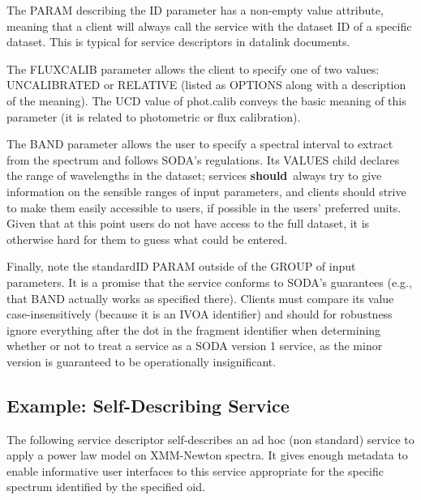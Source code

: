 \documentclass[11pt,a4paper]{ivoa}
\newcommand{\rfcshould}{\textbf{should}}
\begin{document}
The PARAM describing the ID parameter has a non-empty value attribute,
meaning that a client will always call the service with the dataset ID
of a specific dataset.  This is typical for service descriptors in
datalink documents.

The FLUXCALIB parameter allows the client to specify one of two values:
UNCALIBRATED or RELATIVE (listed as OPTIONS along with a description of
the meaning). The UCD \citep{2005ivoa.spec.0819D} value
of phot.calib conveys the basic meaning
of this parameter (it is related to photometric or flux calibration).


The BAND parameter allows the user to specify a spectral interval to
extract from the spectrum and follows SODA's regulations.  Its VALUES
child declares the range of wavelengths in the dataset; services \rfcshould\
always try to give information on the sensible ranges of input
parameters, and clients should strive to make them easily accessible to
users, if possible in the users' preferred units.  Given that at this
point users do not have access to the full dataset, it is otherwise hard
for them to guess what could be entered.

Finally, note the standardID PARAM outside of the GROUP of input
parameters.  It is a promise that the service conforms to SODA's
guarantees (e.g., that BAND actually works as specified there).  Clients
must compare its value case-insensitively (because it is an IVOA
identifier) and should for robustness ignore everything after the dot in
the fragment identifier when determining whether or not to treat a
service as a SODA version 1 service, as the minor version is guaranteed
to be operationally insignificant.


\subsection{Example: Self-Describing Service}

The following service descriptor self-describes an ad hoc (non standard) 
service to apply a power law model on XMM-Newton spectra.
  It gives enough metadata to enable informative user interfaces to this
 service appropriate for the specific spectrum identified by the specified oid.
\end{document}
